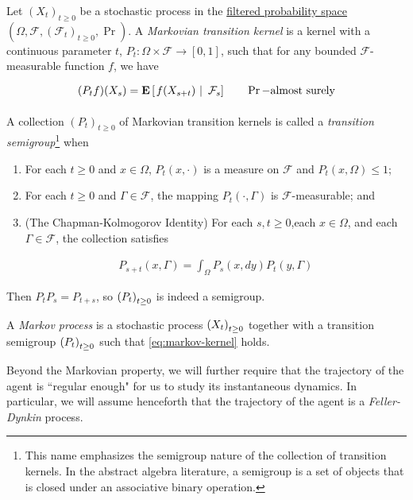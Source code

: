 \begin{definition}\label{def:transition-semigroup}
  Let $(X_t)_{t\geq 0}$ be a stochastic process in the
  \hyperref[def:filtration]{filtered probability space} $(\Omega,
  \mathcal{F}, (\mathcal{F}_t)_{t\geq 0}, \Pr)$. A \emph{Markovian
    transition kernel} is a kernel with a continuous parameter $t$,
  $P_t:\Omega\times\mathcal{F}\to[0,1]$, such that for any bounded
  $\mathcal{F}$-measurable function $f$, we have

  \begin{equation}\label{eq:markov-kernel}
    (P_tf)(X_s) = \ConditionExpect{f(X_{s+t})}{\mathcal{F}_s}\qquad
                                                                  \Pr-\text{almost surely}
  \end{equation}

  A collection $(P_t)_{t\geq 0}$ of Markovian transition kernels is called a
  \emph{transition semigroup}\footnote{This name emphasizes
    the semigroup nature of the collection of transition kernels. In
    the abstract algebra literature, a semigroup is a set of objects that is
  closed under an associative binary operation.} when
  \begin{enumerate}
  \item For each $t\geq 0$ and $x\in\Omega$, $P_t(x,\cdot)$ is a
    measure on $\mathcal{F}$ and $P_t(x,\Omega)\leq 1$;
  \item For each $t\geq 0$ and $\Gamma\in\mathcal{F}$, the mapping
    $P_t(\cdot,\Gamma)$ is $\mathcal{F}$-measurable; and
  \item (The Chapman-Kolmogorov Identity) For each $s,t\geq 0$,each
    $x\in\Omega$, and each $\Gamma\in\mathcal{F}$, the collection
    satisfies

    \begin{align*}
    P_{s+t}(x,
    \Gamma) = \int_\Omega P_s(x, dy)P_t(y, \Gamma)
    \end{align*}
  \end{enumerate}
  Then $P_tP_s = P_{t+s}$, so $\indexedabove{t}{P}$ is indeed a semigroup.

  A \emph{Markov process} is a stochastic process $\indexedabove{t}{X}$ together
  with a transition semigroup $\indexedabove{t}{P}$ such that
  \eqref{eq:markov-kernel} holds.
\end{definition}

Beyond the Markovian property, we will further require that the trajectory of
the agent is ``regular enough" for us to study its instantaneous dynamics. In
particular, we will assume henceforth that the trajectory of the agent is a
\emph{Feller-Dynkin} process.

